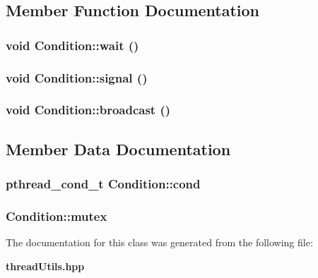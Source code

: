 \subsection{Member Function Documentation}
\subsubsection{\setlength{\rightskip}{0pt plus 5cm}void Condition::wait ()\hspace{0.3cm}{\tt  [inline]}}\label{classCondition_0bb9ca22c3c755d0ed8c7483a857567a}


\subsubsection{\setlength{\rightskip}{0pt plus 5cm}void Condition::signal ()\hspace{0.3cm}{\tt  [inline]}}\label{classCondition_974c8fd419e6014028dc4147cc49ce56}


\subsubsection{\setlength{\rightskip}{0pt plus 5cm}void Condition::broadcast ()\hspace{0.3cm}{\tt  [inline]}}\label{classCondition_15d88ea71e837f967d13d805d675cc5b}




\subsection{Member Data Documentation}
\subsubsection{\setlength{\rightskip}{0pt plus 5cm}pthread\_\-cond\_\-t {\bf Condition::cond}\hspace{0.3cm}{\tt  [private]}}\label{classCondition_4c8982005641d63b696f671b28e3706d}


\subsubsection{ {\bf Condition::mutex}\hspace{0.3cm}{\tt  [private]}}\label{classCondition_01622814c6a21250677c2b9cbfc86bfb}




The documentation for this class was generated from the following file:\begin{CompactItemize}
\item 
{\bf thread\-Utils.hpp}\end{CompactItemize}
